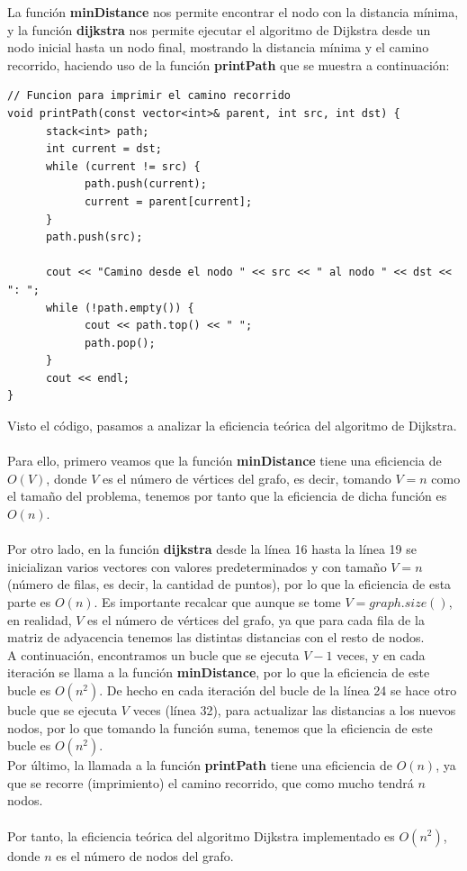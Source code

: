 \documentclass[11pt,openany]{book}
\begin{document}
La función \textbf{minDistance} nos permite encontrar el nodo con la distancia mínima, y la función \textbf{dijkstra} nos permite ejecutar
el algoritmo de Dijkstra desde un nodo inicial hasta un nodo final, mostrando la distancia mínima y el camino recorrido, haciendo uso
de la función \textbf{printPath} que se muestra a continuación:
\begin{lstlisting}
// Funcion para imprimir el camino recorrido
void printPath(const vector<int>& parent, int src, int dst) {
      stack<int> path;
      int current = dst;
      while (current != src) {
            path.push(current);
            current = parent[current];
      }
      path.push(src);

      cout << "Camino desde el nodo " << src << " al nodo " << dst << ": ";
      while (!path.empty()) {
            cout << path.top() << " ";
            path.pop();
      }
      cout << endl;
}
\end{lstlisting}
Visto el código, pasamos a analizar la eficiencia teórica del algoritmo de Dijkstra.\\ \\
Para ello, primero veamos que la función \textbf{minDistance} tiene una eficiencia de $O(V)$, donde $V$ es el número de vértices del grafo, es decir, tomando $V=n$
como el tamaño del problema, tenemos por tanto que la eficiencia de dicha función es $O(n)$. \\ \\
Por otro lado, en la función \textbf{dijkstra} desde la línea 16 hasta la línea 19 se inicializan varios vectores con valores
predeterminados y con tamaño $V=n$ (número de filas, es decir, la cantidad de puntos), por lo que la eficiencia de esta parte es $O(n)$. Es importante recalcar que aunque se tome 
$V=graph.size()$, en realidad, $V$ es el número de vértices del grafo, ya que para cada fila de la matriz de adyacencia tenemos las distintas distancias con el resto de nodos. \\
A continuación, encontramos un bucle que se ejecuta $V-1$ veces, y en cada iteración se llama a la función \textbf{minDistance}, por lo que la eficiencia de este bucle es $O(n^2)$. De hecho
en cada iteración del bucle de la línea 24 se hace otro bucle que se ejecuta $V$ veces (línea 32), para actualizar las distancias a los nuevos nodos, por lo que tomando la función suma, tenemos que la eficiencia de este bucle
es $O(n^2)$.\\
Por último, la llamada a la función \textbf{printPath} tiene una eficiencia de $O(n)$, ya que se recorre (imprimiento) el camino recorrido, que como mucho tendrá $n$ nodos.\\ \\
Por tanto, la eficiencia teórica del algoritmo Dijkstra implementado es $O(n^2)$, donde $n$ es el número de nodos del grafo.\\ \\
\end{document}
